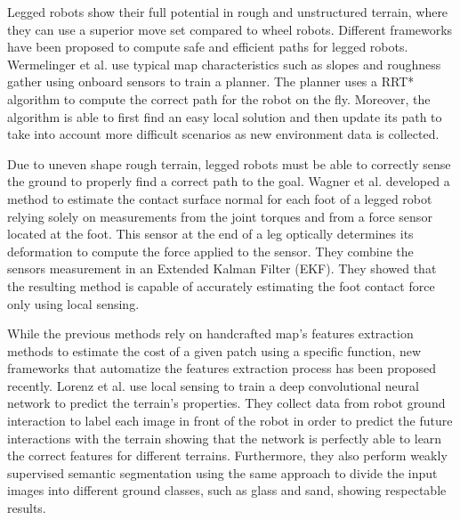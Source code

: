 \documentclass[../document.tex]{subfiles}
\begin{document}
Legged robots show their full potential in rough and unstructured terrain, where they can use a superior move set compared to wheel robots. Different frameworks have been proposed to compute safe and efficient paths for legged robots. Wermelinger et al. \cite{wermelinger2016navigation} use typical map characteristics such as slopes and roughness gather using onboard sensors to train a planner. The planner uses a RRT* algorithm to compute the correct path for the robot on the fly. Moreover, the algorithm is able to first find an easy local solution and then update its path to take into account more difficult scenarios as new environment data is collected. 

Due to uneven shape rough terrain, legged robots must be able to correctly sense the ground to properly find a correct path to the goal. Wagner et al. \cite{wagner2016foot} developed a method to estimate the contact surface normal for each foot of a legged robot relying solely on measurements from the joint torques and from a force sensor located at the foot. This sensor at the end of a leg optically determines its deformation to compute the force applied to the sensor. They combine the sensors measurement in an Extended Kalman Filter (EKF). They showed that the resulting method is capable of accurately estimating the foot contact force only using local sensing.

While the previous methods rely on handcrafted map's features extraction methods to estimate the cost of a given patch using a specific function, new frameworks that automatize the features extraction process has been proposed recently. Lorenz et al. \cite{wellhausen2019where} use local sensing to train a deep convolutional neural network to predict the terrain's properties. They collect data from robot ground interaction to label each image in front of the robot in order to predict the future interactions with the terrain showing that the network is perfectly able to learn the correct features for different terrains.
Furthermore, they also perform weakly supervised semantic segmentation using the same approach to divide the input images into different ground classes, such as glass and sand, showing respectable results.
\end{document}
